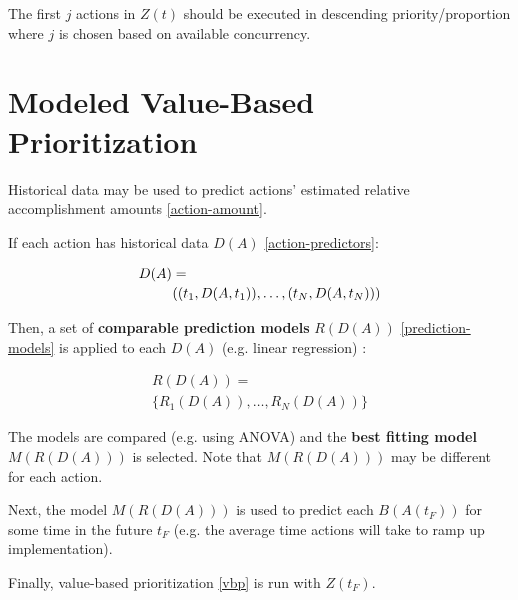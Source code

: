 \documentclass[12pt, a4paper, twocolumn]{article}
\begin{document}
The first $j$ actions in $Z(t)$ should be executed in descending priority/proportion where $j$ is chosen based on available concurrency.

\section{Modeled Value-Based Prioritization}

Historical data may be used to predict actions' estimated relative accomplishment amounts \eqref{action-amount}.

If each action has historical data $D(A)$ \eqref{action-predictors}:

\begin{equation}\label{action-predictors}
\begin{multlined}
D(A) = \\
\shoveleft[0.5cm]{((t_1, D(A,t_1)), \ldots, (t_N, D(A,t_N)))}
\end{multlined}
\end{equation}

Then, a set of \textbf{comparable prediction models} $R(D(A))$ \eqref{prediction-models} is applied to each $D(A)$ (e.g. linear regression) :

\begin{equation}\label{prediction-models}
\begin{multlined}
R(D(A)) =\\
\{R_1(D(A)), \ldots, R_N(D(A))\}
\end{multlined}
\end{equation}

The models are compared (e.g. using ANOVA) and the \textbf{best fitting model} $M(R(D(A)))$ is selected. Note that $M(R(D(A)))$ may be different for each action.

Next, the model $M(R(D(A)))$ is used to predict each $B(A(t_F))$ for some time in the future $t_F$ (e.g. the average time actions will take to ramp up implementation).

Finally, value-based prioritization \eqref{vbp} is run with $Z(t_F)$.


\nocite{*}


\end{document}
